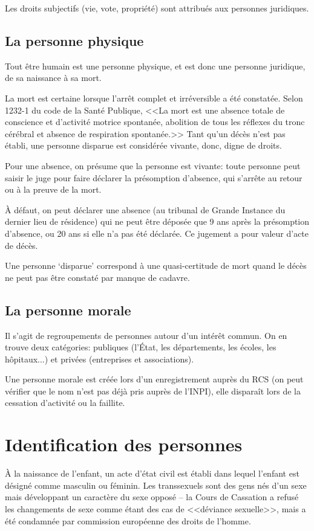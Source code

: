\documentclass[10pt,a4paper]{article}
\begin{document}
Les droits subjectifs (vie, vote, propriété) sont attribués aux personnes juridiques.

\subsection{La personne physique}

Tout être humain est une personne physique, et est donc une personne juridique, de sa naissance à sa mort.

La mort est certaine lorsque l'arrêt complet et irréversible a été constatée. Selon 1232-1 du code de la Santé Publique, <<La mort est une absence totale de conscience et d'activité motrice spontanée, abolition de tous les réflexes du tronc cérébral et absence de respiration spontanée.>> Tant qu'un décès n'est pas établi, une personne disparue est considérée vivante, donc, digne de droits.

Pour une absence, on présume que la personne est vivante: toute personne peut saisir le juge pour faire déclarer la présomption d'absence, qui s'arrête au retour ou à la preuve de la mort.

À défaut, on peut déclarer une absence (au tribunal de Grande Instance du dernier lieu de résidence) qui ne peut être déposée que 9 ans après la présomption d'absence, ou 20 ans si elle n'a pas été déclarée. Ce jugement a pour valeur d'acte de décès.

Une personne `disparue' correspond à une quasi-certitude de mort quand le décès ne peut pas être constaté par manque de cadavre.

\subsection{La personne morale}

Il s'agit de regroupements de personnes autour d'un intérêt commun. On en trouve deux catégories: publiques (l'État, les départements, les écoles, les hôpitaux...) et privées (entreprises et associations).

Une personne morale est créée lors d'un enregistrement auprès du RCS (on peut vérifier que le nom n'est pas déjà pris auprès de l'INPI), elle disparaît lors de la cessation d'activité ou la faillite.

\section{Identification des personnes}

À la naissance de l'enfant, un acte d'état civil est établi dans lequel l'enfant est désigné comme masculin ou féminin. Les transsexuels sont des gens nés d'un sexe mais développant un caractère du sexe opposé -- la Cours de Cassation a refusé les changements de sexe comme étant des cas de <<déviance sexuelle>>, mais a été condamnée par commission européenne des droits de l'homme.
\end{document}
